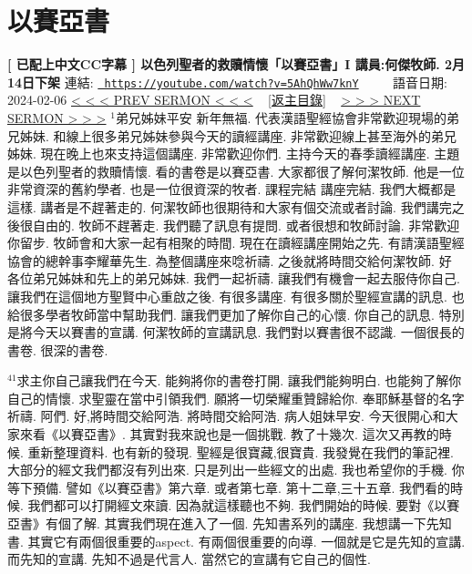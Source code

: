 \documentclass{book}
\begin{document}
\section{以賽亞書}
\label{sec:5AhQhWw7knY}
\textbf{[ 已配上中文CC字幕 ] 以色列聖者的救贖情懷「以賽亞書」I 講員:何傑牧師. 2月14日下架}
\newline
\newline
連結: \href{https://youtube.com/watch?v=5AhQhWw7knY}{\texttt{ https://youtube.com/watch?v=5AhQhWw7knY}} ~~~~ 語音日期: 2024-02-06 
\newline
\newline
\hyperref[sec:code]{\small{< < < PREV SERMON < < <}}
~
\hyperref[sec:index]{\small{[返主目錄]}}
~
\hyperref[sec:KwXlOVraPWE]{\small{> > > NEXT SERMON > > >}}
\newline
\newline
$^{1}$弟兄姊妹平安 新年無福.
代表漢語聖經協會非常歡迎現場的弟兄姊妹.
和線上很多弟兄姊妹參與今天的讀經講座.
非常歡迎線上甚至海外的弟兄姊妹.
現在晚上也來支持這個講座.
非常歡迎你們.
主持今天的春季讀經講座.
主題是以色列聖者的救贖情懷.
看的書卷是以賽亞書.
大家都很了解何潔牧師.
他是一位非常資深的舊約學者.
也是一位很資深的牧者.
課程完結 講座完結.
我們大概都是這樣.
講者是不趕著走的.
何潔牧師也很期待和大家有個交流或者討論.
我們講完之後很自由的.
牧師不趕著走.
我們聽了訊息有提問.
或者很想和牧師討論.
非常歡迎你留步.
牧師會和大家一起有相聚的時間.
現在在讀經講座開始之先.
有請漢語聖經協會的總幹事李耀華先生.
為整個講座來唸祈禱.
之後就將時間交給何潔牧師.
好 各位弟兄姊妹和先上的弟兄姊妹.
我們一起祈禱.
讓我們有機會一起去服侍你自己.
讓我們在這個地方聖賢中心重啟之後.
有很多講座.
有很多關於聖經宣講的訊息.
也給很多學者牧師當中幫助我們.
讓我們更加了解你自己的心懷.
你自己的訊息.
特別是將今天以賽書的宣講.
何潔牧師的宣講訊息.
我們對以賽書很不認識.
一個很長的書卷.
很深的書卷.

$^{41}$求主你自己讓我們在今天.
能夠將你的書卷打開.
讓我們能夠明白.
也能夠了解你自己的情懷.
求聖靈在當中引領我們.
願將一切榮耀重贊歸給你.
奉耶穌基督的名字祈禱.
阿們.
好,將時間交給阿浩.
將時間交給阿浩.
病人姐妹早安.
今天很開心和大家來看《以賽亞書》.
其實對我來說也是一個挑戰.
教了十幾次.
這次又再教的時候.
重新整理資料.
也有新的發現.
聖經是很寶藏,很寶貴.
我發覺在我們的筆記裡.
大部分的經文我們都沒有列出來.
只是列出一些經文的出處.
我也希望你的手機.
你等下預備.
譬如《以賽亞書》第六章.
或者第七章.
第十二章,三十五章.
我們看的時候.
我們都可以打開經文來讀.
因為就這樣聽也不夠.
我們開始的時候.
要對《以賽亞書》有個了解.
其實我們現在進入了一個.
先知書系列的講座.
我想講一下先知書.
其實它有兩個很重要的aspect.
有兩個很重要的向導.
一個就是它是先知的宣講.
而先知的宣講.
先知不過是代言人.
當然它的宣講有它自己的個性.
\end{document}
